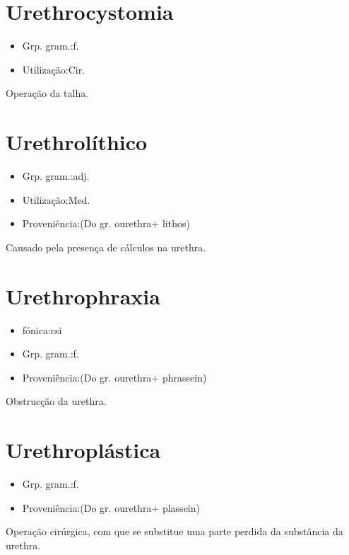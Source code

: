 \documentclass{article}
\begin{document}
\section{Urethrocystomia}
\begin{itemize}
\item {Grp. gram.:f.}
\end{itemize}
\begin{itemize}
\item {Utilização:Cir.}
\end{itemize}
Operação da talha.
\section{Urethrolíthico}
\begin{itemize}
\item {Grp. gram.:adj.}
\end{itemize}
\begin{itemize}
\item {Utilização:Med.}
\end{itemize}
\begin{itemize}
\item {Proveniência:(Do gr. \textunderscore ourethra\textunderscore  + \textunderscore lithos\textunderscore )}
\end{itemize}
Causado pela presença de cálculos na urethra.
\section{Urethrophraxia}
\begin{itemize}
\item {fónica:csi}
\end{itemize}
\begin{itemize}
\item {Grp. gram.:f.}
\end{itemize}
\begin{itemize}
\item {Proveniência:(Do gr. \textunderscore ourethra\textunderscore  + \textunderscore phrassein\textunderscore )}
\end{itemize}
Obstrucção da urethra.
\section{Urethroplástica}
\begin{itemize}
\item {Grp. gram.:f.}
\end{itemize}
\begin{itemize}
\item {Proveniência:(Do gr. \textunderscore ourethra\textunderscore  + \textunderscore plassein\textunderscore )}
\end{itemize}
Operação cirúrgica, com que se substitue uma parte perdida da substância da urethra.
\end{document}
